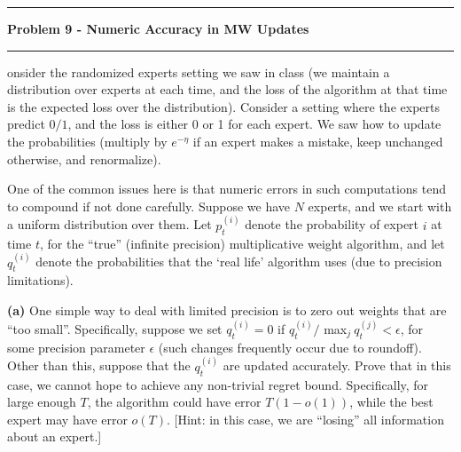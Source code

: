 \documentclass[11pt]{article}
\newcommand\question[2]{\vspace{.25in}\hrule\textbf{#1}\vspace{.5em}\hrule\vspace{.10in}}
\renewcommand\part[1]{\vspace{.10in}\textbf{(#1)}}
\begin{document}
\question{Problem 9 - Numeric Accuracy in MW Updates}

Consider the randomized experts setting we saw in class (we maintain a distribution over experts at each time, and the loss of the algorithm at that time is the expected loss over the distribution). Consider a setting where the experts predict $0/1$, and the loss is either 0 or 1 for each expert. We saw how to update the probabilities (multiply by $e^{-\eta}$ if an expert makes a mistake, keep unchanged otherwise, and renormalize).

One of the common issues here is that numeric errors in such computations tend to compound if not done carefully. Suppose we have $N$ experts, and we start with a uniform distribution over them. Let $p_t^{(i)}$ denote the probability of expert $i$ at time $t$, for the ``true'' (infinite precision) multiplicative weight algorithm, and let $q_t^{(i)}$ denote the probabilities that the `real life' algorithm uses (due to precision limitations).

\part{a} One simple way to deal with limited precision is to zero out weights that are ``too small''. Specifically, suppose we set $q_t^{(i)} = 0$ if $q_t^{(i)} /$ max$_j \ q_t^{(j)} < \epsilon$, for some precision parameter $\epsilon$ (such changes frequently occur due to roundoff). Other than this, suppose that the $q_t^{(i)}$ are updated accurately. Prove that in this case, we cannot hope to achieve any non-trivial regret bound. Specifically, for large enough $T$, the algorithm could have error $T(1 - o(1))$, while the best expert may have error $o(T)$. [Hint: in this case, we are ``losing'' all information about an expert.]
\end{document}
